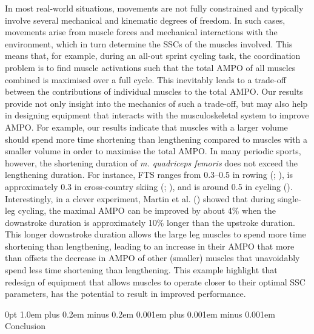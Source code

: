 \documentclass[
  11pt,
  a4paper]{article}
\makeatletter
\renewcommand{\subsection}{%
  \@startsection{subsection}{2}
    {0pt} 					%
    {1.0em plus 0.2em minus 0.2em} 	%
    {0.001em plus 0.001em minus 0.001em}    	%
    {\large\bfseries\sffamily}%
}
\makeatother
\begin{document}
In most real-world situations, movements are not fully constrained and
typically involve several mechanical and kinematic degrees of freedom.
In such cases, movements arise from muscle forces and mechanical
interactions with the environment, which in turn determine the SSCs of
the muscles involved. This means that, for example, during an all-out
sprint cycling task, the coordination problem is to find muscle
activations such that the total AMPO of all muscles combined is
maximised over a full cycle. This inevitably leads to a trade-off
between the contributions of individual muscles to the total AMPO. Our
results provide not only insight into the mechanics of such a trade-off,
but may also help in designing equipment that interacts with the
musculoskeletal system to improve AMPO. For example, our results
indicate that muscles with a larger volume should spend more time
shortening than lengthening compared to muscles with a smaller volume in
order to maximise the total AMPO. In many periodic sports, however, the
shortening duration of \emph{m. quadriceps femoris} does not exceed the
lengthening duration. For instance, FTS ranges from 0.3--0.5 in rowing
(;
), is approximately
0.3 in cross-country skiing
(;
), and is
around 0.5 in cycling (). Interestingly, in a clever experiment, Martin et al.
() showed that during single-leg
cycling, the maximal AMPO can be improved by about 4\% when the
downstroke duration is approximately 10\% longer than the upstroke
duration. This longer downstroke duration allows the large leg muscles
to spend more time shortening than lengthening, leading to an increase
in their AMPO that more than offsets the decrease in AMPO of other
(smaller) muscles that unavoidably spend less time shortening than
lengthening. This example highlight that redesign of equipment that
allows muscles to operate closer to their optimal SSC parameters, has
the potential to result in improved performance.

\subsection{Conclusion}\label{conclusion}
\end{document}

